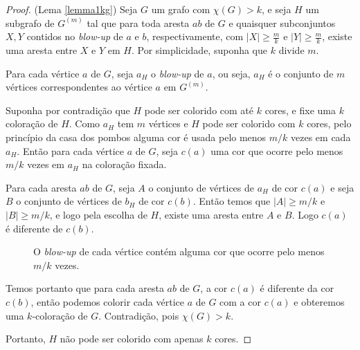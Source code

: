 \begin{proof}{(Lema \ref{lemma1kg})} Seja $G$ um grafo com $\chi(G) > k$, e seja $H$ um subgrafo de $G^{(m)}$ tal que para toda aresta $ab$ de $G$ e quaisquer subconjuntos $X,Y$ contidos no \textit{blow-up} de $a$ e $b$, respectivamente, com $|X| \geq \frac{m}{k}$ e $|Y| \geq \frac{m}{k}$, existe uma aresta entre $X$ e $Y$ em $H$. Por simplicidade, suponha que $k$ divide $m$.

Para cada vértice $a$ de $G$, seja $a_H$ o \textit{blow-up} de $a$, ou seja, $a_H$ é o conjunto de $m$ vértices correspondentes ao vértice $a$ em $G^{(m)}$.

Suponha por contradição que $H$ pode ser colorido com até $k$ cores, e fixe uma $k$ coloração de $H$. Como $a_H$ tem $m$ vértices e $H$ pode ser colorido com $k$ cores, pelo princípio da casa dos pombos alguma cor é usada pelo menos $m/k$ vezes em cada $a_H$. Então para cada vértice $a$ de $G$, seja $c(a)$ uma cor que ocorre pelo menos $m/k$ vezes em $a_H$ na coloração fixada.

Para cada aresta $ab$ de $G$, seja $A$ o conjunto de vértices de $a_H$ de cor $c(a)$ e seja $B$ o conjunto de vértices de $b_H$ de cor $c(b)$. Então temos que $|A| \geq m/k$ e $|B| \geq m/k$, e logo pela escolha de $H$, existe uma aresta entre $A$ e $B$. Logo $c(a)$ é diferente de $c(b)$.

\begin{figure}[H]
\centering
{}
\caption{O \textit{blow-up} de cada vértice contém alguma cor que ocorre pelo menos $m/k$ vezes.}
\label{fig:knesercolorsets}
\end{figure}

Temos portanto que para cada aresta $ab$ de $G$, a cor $c(a)$ é diferente da cor $c(b)$, então podemos colorir cada vértice $a$ de $G$ com a cor $c(a)$ e obteremos uma $k$-coloração de $G$. Contradição, pois $\chi(G) > k$.

Portanto, $H$ não pode ser colorido com apenas $k$ cores.

\end{proof}

